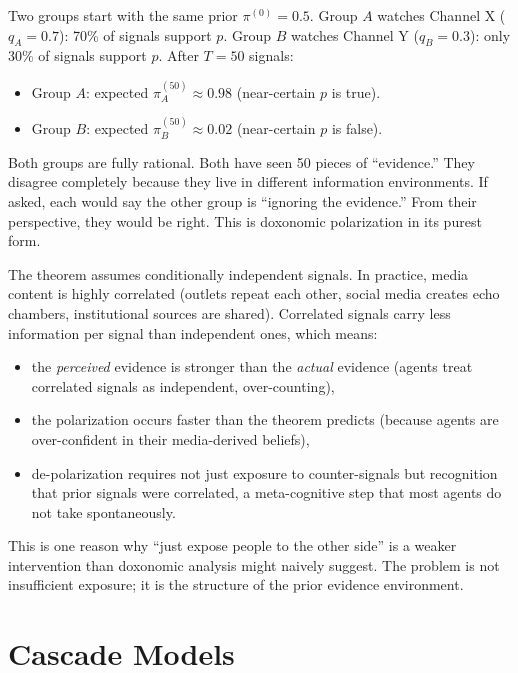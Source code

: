 \begin{example}
\label{ex:polarization-numerical}
Two groups start with the same prior $\pi^{(0)} = 0.5$.
Group $A$ watches Channel X ($q_A = 0.7$): 70\% of signals support $p$.
Group $B$ watches Channel Y ($q_B = 0.3$): only 30\% of signals support $p$.
After $T = 50$ signals:
\begin{itemize}[nosep]
  \item Group $A$: expected $\pi_A^{(50)} \approx 0.98$ (near-certain $p$ is true).
  \item Group $B$: expected $\pi_B^{(50)} \approx 0.02$ (near-certain $p$ is false).
\end{itemize}
Both groups are fully rational.
Both have seen 50 pieces of ``evidence.''
They disagree completely because they live in different information environments.
If asked, each would say the other group is ``ignoring the evidence.'' From their perspective, they would be right.
This is doxonomic polarization in its purest form.
\end{example}

\begin{remark}
\label{rem:correlated}
The theorem assumes conditionally independent signals.
In practice, media content is highly correlated (outlets repeat each other, social media creates echo chambers, institutional sources are shared).
Correlated signals carry less information per signal than independent ones, which means:
\begin{itemize}[nosep]
  \item the \emph{perceived} evidence is stronger than the \emph{actual} evidence (agents treat correlated signals as independent, over-counting),
  \item the polarization occurs faster than the theorem predicts (because agents are over-confident in their media-derived beliefs),
  \item de-polarization requires not just exposure to counter-signals but recognition that prior signals were correlated, a meta-cognitive step that most agents do not take spontaneously.
\end{itemize}
This is one reason why ``just expose people to the other side'' is a weaker intervention than doxonomic analysis might naively suggest.
The problem is not insufficient exposure; it is the structure of the prior evidence environment.
\end{remark}


\section{Cascade Models}
\label{sec:ch11-cascades}

